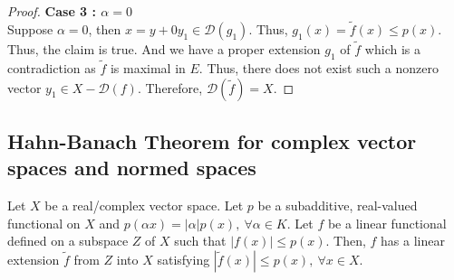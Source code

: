\begin{proof}
	\textbf{Case 3 : $\alpha =0$}\\
	Suppose $\alpha = 0$, then $x = y+0y_1 \in \mathscr{D}(g_1)$.
	Thus, $g_1(x) = \tilde{f}(x) \le p(x)$.\\

	Thus, the claim is true.
	And we have a proper extension $g_1$ of $\tilde{f}$ which is a contradiction as $\tilde{f}$ is maximal in $E$.
	Thus, there does not exist such a nonzero vector $y_1 \in X - \mathscr{D}(f)$.
	Therefore, $\mathscr{D}(\tilde{f}) = X$.
\end{proof}

\subsection{Hahn-Banach Theorem for complex vector spaces and normed spaces}
\begin{theorem}
	Let $X$ be a real/complex vector space.
	Let $p$ be a subadditive, real-valued functional on $X$ and $p(\alpha x) = |\alpha|p(x),\ \forall \alpha \in K$.
	Let $f$ be a linear functional defined on a subspace $Z$ of $X$ such that $|f(x)| \le p(x)$.
	Then, $f$ has a linear extension $\tilde{f}$ from $Z$ into $X$ satisfying $|\tilde{f}(x)| \le p(x),\ \forall x \in X$.
\end{theorem}
